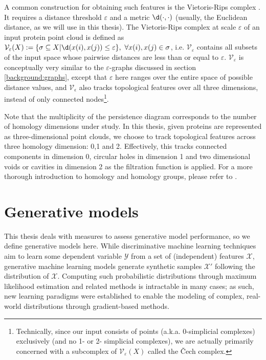 A common construction for obtaining such features is the Vietoris-Rips complex
\citep{vietoris1927hoheren}. It requires a distance threshold $\varepsilon$ and
a metric $\d( \cdot, \cdot)$ (usually, the Euclidean distance, as we will
use in this thesis). The Vietoris-Rips complex at scale $\varepsilon$ of an
input protein point cloud is defined as
$\mathcal{V}_{\varepsilon}(X):=\{\sigma\subseteq X| \d(x(i),
x(j))\leq\varepsilon\},\ \forall x(i),x(j)\in\sigma$, i.e.
$\mathcal{V}_{\varepsilon}$ contains all subsets of the input space whose
pairwise distances are less than or equal to $\varepsilon$.
$\mathcal{V}_{\varepsilon}$ is conceptually very similar to the
$\varepsilon$-graphs discussed in section \ref{background:graphs}, except that
$\varepsilon$ here ranges over the entire space of possible distance values, and
$\mathcal{V}_{\epsilon}$ also tracks topological features over all three
dimensions, instead of only connected nodes\footnote{Technically, since our
input consists of points (a.k.a. 0-simplicial complexes) exclusively (and no 1-
or 2- simplicial complexes), we are actually primarily concerned with a
subcomplex of $\mathcal{V}_{\varepsilon}(X)$ called the \v{C}ech complex.}.

Note that the multiplicity of the persistence diagram corresponds to the number
of homology dimensions under study. In this thesis, given proteins are
represented as three-dimensional point clouds, we choose to track topological
features across three homology dimension: 0,1 and 2. Effectively, this tracks
connected components in dimension 0, circular holes in dimension 1 and two
dimensional voids or cavities in dimension 2 as the filtration function is
applied. For a more thorough introduction to homology and homology groups,
please refer to \citet{edelsbrunner2010computational}.

\section{Generative models}\label{genmodels}

This thesis deals with measures to assess generative model performance, so we
define generative models here. While discriminative machine learning techniques
aim to learn some dependent variable $\mathcal{Y}$ from a set of (independent)
features $\mathcal{X}$, generative machine learning models generate synthetic
samples $\mathcal{X}'$ following the distribution of $\mathcal{X}$. Computing
such probabilistic distributions through maximum likelihood estimation and
related methods is intractable in many cases; as such, new learning paradigms
were established to enable the modeling of complex, real-world distributions
through gradient-based methods.

